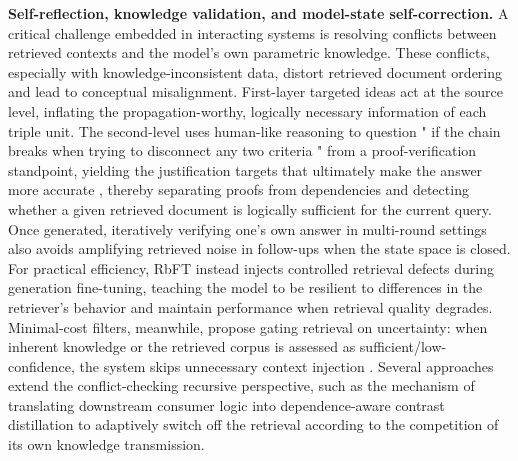 \documentclass[11pt,a4paper]{article}
\begin{document}
\textbf{Self-reflection, knowledge validation, and model-state self-correction.} A critical challenge embedded in interacting systems is resolving conflicts between retrieved contexts and the model's own parametric knowledge. These conflicts, especially with knowledge-inconsistent data, distort retrieved document ordering and lead to conceptual misalignment. First-layer targeted ideas act at the source level, inflating the propagation-worthy, logically necessary information of each triple unit. The second-level uses human-like reasoning to question " if the chain breaks when trying to disconnect any two criteria " from a proof-verification standpoint, yielding the justification targets that ultimately make the answer more accurate \cite{arxiv:2604.12610v1}, thereby separating proofs from dependencies and detecting whether a given retrieved document is logically sufficient for the current query. Once generated, iteratively verifying one's own answer in multi-round settings also avoids amplifying retrieved noise in follow-ups when the state space is closed. For practical efficiency, RbFT \cite{arxiv:2501.18365v1} instead injects controlled retrieval defects during generation fine-tuning, teaching the model to be resilient to differences in the retriever's behavior and maintain performance when retrieval quality degrades. Minimal-cost filters, meanwhile, propose gating retrieval on uncertainty: when inherent knowledge or the retrieved corpus is assessed as sufficient/low-confidence, the system skips unnecessary context injection \cite{arxiv:2410.13339v2}. Several approaches extend the conflict-checking recursive perspective, such as the mechanism of translating downstream consumer logic into dependence-aware contrast distillation to adaptively switch off the retrieval according to the competition of its own knowledge transmission.
\end{document}
